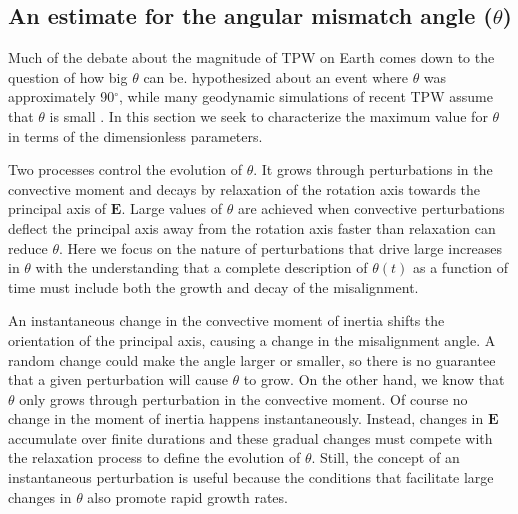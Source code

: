 \documentclass[preprint,12pt,authoryear]{elsarticle}
\begin{document}
\subsection{An estimate for the angular mismatch angle ($\theta$)}
\label{sec:theta}

Much of the debate about the magnitude of TPW on Earth comes down to the question of how big $\theta$ can be.
\citet{kirschvink1997evidence} hypothesized about an event where $\theta$ was approximately 90$^\circ$,
while many geodynamic simulations of recent TPW assume that $\theta$ is small \citep{steinberger1997changes}.
In this section we seek to characterize the maximum value for $\theta$ in terms of the dimensionless parameters.

Two processes control the evolution of $\theta$. It grows through perturbations in the convective moment and  decays by relaxation of the rotation axis towards the principal axis of $\mathbf{E}$. Large values of $\theta$ are achieved when
convective perturbations deflect the principal axis away from the rotation axis faster than relaxation can reduce $\theta$. Here we focus on the nature of
perturbations that drive large increases in $\theta$ with the understanding that a complete description of $\theta(t)$ as a function of time must include both the growth and decay of the misalignment. 

An instantaneous change in the convective moment of inertia shifts the orientation of the principal axis, causing a change in the misalignment angle. A random change could make the angle larger or smaller, so there is no guarantee that a given perturbation will cause $\theta$ to grow. On the other hand,  we know that $\theta$ only grows through perturbation in the convective moment. Of course no change in the moment of inertia happens instantaneously. Instead,  changes in $\mathbf{E}$ accumulate over  finite durations and these gradual changes must compete with the relaxation process to define the evolution of $\theta$. Still, the concept of an instantaneous perturbation is useful because the conditions that facilitate large changes in $\theta$ also promote rapid growth rates. 
\end{document}
